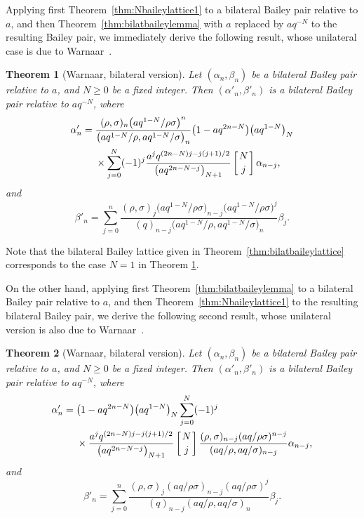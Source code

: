 \documentclass[pdftex]{sigma}
\numberwithin{equation}{section}
\newtheorem{Theorem}{Theorem}[section]
\begin{document}
Applying first Theorem~\ref{thm:Nbaileylattice1} to a bilateral Bailey pair relative to $a$, and then Theorem~\ref{thm:bilatbaileylemma} with $a$ replaced by $aq^{-N}$ to the resulting Bailey pair, we immediately derive the following result, whose unilateral case is due to Warnaar~\cite[Theorem~3.1]{W}.

\begin{Theorem}[Warnaar, bilateral version]\label{thm:w1}
Let $(\alpha_n, \beta_n)$ be a bilateral Bailey pair relative to $a$, and $N\geq 0$ be a fixed integer. Then $(\alpha'_n, \beta'_n)$ is a bilateral Bailey pair relative to $aq^{-N}$, where
\begin{align*}
\alpha'_n={}&\frac{(\rho,\sigma)_n\bigl(aq^{1-N}/\rho\sigma\bigr)^n}{
\bigl(aq^{1-N}/\rho,aq^{1-N}/\sigma\bigr)_n}\bigl(1-aq^{2n-N}\bigr)\bigl(aq^{1-N}\bigr)_N\\
&\times\sum_{j=0}^N(-1)^j\frac{a^jq^{(2n-N)j-j(j+1)/2}}{\bigl(aq^{2n-N-j}\bigr)_{N+1}}\left[{N\atop j}\right]\alpha_{n-j},
\end{align*}
and
\begin{equation*}
\beta'_n=\sum_{j=0}^n\frac{(\rho,\sigma)_j\bigl(aq^{1-N}/\rho\sigma\bigr)_{n-j}\bigl(aq^{1-N}/\rho\sigma\bigr)^j}{(q)_{n-j}\bigl(aq^{1-N}/\rho,aq^{1-N}/\sigma\bigr)_n} \beta_j.
\end{equation*}
\end{Theorem}

Note that the bilateral Bailey lattice given in Theorem~\ref{thm:bilatbaileylattice} corresponds to the case $N=1$ in Theorem \ref{thm:w1}.

On the other hand, applying first Theorem~\ref{thm:bilatbaileylemma} to a bilateral Bailey pair relative to $a$, and then Theorem~\ref{thm:Nbaileylattice1} to the resulting bilateral Bailey pair, we derive the following second result, whose unilateral version is also due to Warnaar~\cite[Theorem~3.2]{W}.
\begin{Theorem}[Warnaar, bilateral version]\label{thm:w2}
Let $(\alpha_n, \beta_n)$ be a bilateral Bailey pair relative to $a$, and $N\geq 0$ be a fixed integer. Then $(\alpha'_n, \beta'_n)$ is a bilateral Bailey pair relative to $aq^{-N}$, where
\begin{align*}
\alpha'_n={}&\bigl(1-aq^{2n-N}\bigr)\bigl(aq^{1-N}\bigr)_N\sum_{j=0}^N(-1)^j\\
&\times\frac{a^jq^{(2n-N)j-j(j+1)/2}}{\bigl(aq^{2n-N-j}\bigr)_{N+1}}\left[{N\atop j}\right]\frac{(\rho,\sigma)_{n-j}(aq/\rho\sigma)^{n-j}}{
(aq/\rho,aq/\sigma)_{n-j}}\alpha_{n-j},
\end{align*}
and
\begin{equation*}
\beta'_n=\sum_{j=0}^n\frac{(\rho,\sigma)_j(aq/\rho\sigma)_{n-j}(aq/\rho\sigma)^j}{(q)_{n-j}(aq/\rho,aq/\sigma)_n} \beta_j.
\end{equation*}
\end{Theorem}
\end{document}
